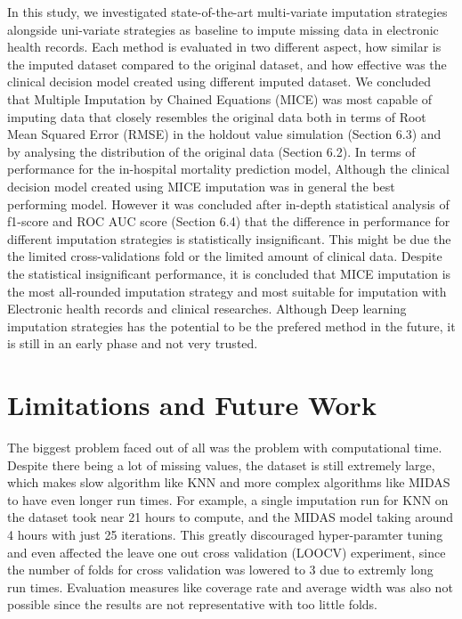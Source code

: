 \documentclass{l4proj}
\begin{document}
In this study, we investigated state-of-the-art multi-variate imputation strategies alongside uni-variate strategies as baseline to impute missing data in electronic health records. Each method is evaluated in two different aspect, how similar is the imputed dataset compared to the original dataset, and how effective was the clinical decision model created using different imputed dataset. We concluded that Multiple Imputation by Chained Equations (MICE) was most capable of imputing data that closely resembles the original data both in terms of Root Mean Squared Error (RMSE) in the holdout value simulation (Section 6.3) and by analysing the distribution of the original data (Section 6.2). In terms of performance for the in-hospital mortality prediction model, Although the clinical decision model created using MICE imputation was in general the best performing model. However it was concluded after in-depth statistical analysis of f1-score and ROC AUC score (Section 6.4) that the difference in performance for different imputation strategies is statistically insignificant. This might be due the the limited cross-validations fold or the limited amount of clinical data. Despite the statistical insignificant performance, it is concluded that MICE imputation is the most all-rounded imputation strategy and most suitable for imputation with Electronic health records and clinical researches. Although Deep learning imputation strategies has the potential to be the prefered method in the future, it is still in an early phase and not very trusted.

\section{Limitations and Future Work}

The biggest problem faced out of all was the problem with computational time. Despite there being a lot of missing values, the dataset is still extremely large, which makes slow algorithm like KNN and more complex algorithms like MIDAS to have even longer run times. For example, a single imputation run for KNN on the dataset took near 21 hours to compute, and the MIDAS model taking around 4 hours with just 25 iterations. This greatly discouraged hyper-paramter tuning and even affected the leave one out cross validation (LOOCV) experiment, since the number of folds for cross validation was lowered to 3 due to extremly long run times. Evaluation measures like coverage rate and average width was also not possible since the results are not representative with too little folds. 
\end{document}
